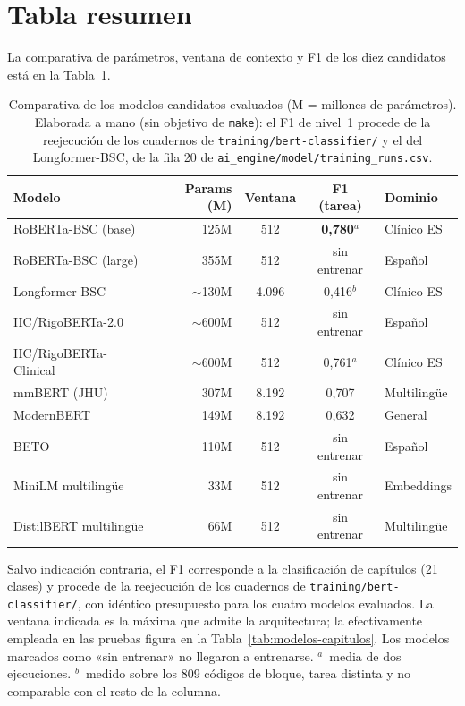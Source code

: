 \Needspace{0.65\textheight}
\section{Tabla resumen}

La comparativa de parámetros, ventana de contexto y F1 de los diez candidatos está en la Tabla~\ref{tab:modelos}.

\begin{table}[h]
\centering
\caption{Comparativa de los modelos candidatos evaluados (M = millones de parámetros). Elaborada a mano (sin objetivo de \texttt{make}): el F1 de nivel~1 procede de la reejecución de los cuadernos de \texttt{training/\allowbreak bert-classifier/} y el del Longformer-BSC, de la fila 20 de \texttt{ai\_engine/\allowbreak model/\allowbreak training\_runs.csv}.}
\label{tab:modelos}
\begin{tabular}{lrccl}
\hline
\textbf{Modelo} & \textbf{Params (M)} & \textbf{Ventana} & \textbf{F1 (tarea)} & \textbf{Dominio} \\
\hline
RoBERTa-BSC (base) & 125M & 512 & \textbf{0{,}780}$^{a}$ & Clínico ES \\
RoBERTa-BSC (large) & 355M & 512 &  sin entrenar & Español \\
Longformer-BSC & $\sim$130M & 4.096 & 0{,}416$^{b}$ & Clínico ES \\
IIC/RigoBERTa-2.0 & $\sim$600M & 512 &  sin entrenar & Español \\
IIC/RigoBERTa-Clinical & $\sim$600M & 512 & 0{,}761$^{a}$ & Clínico ES \\
mmBERT (JHU) & 307M & 8.192 & 0{,}707 & Multilingüe \\
ModernBERT & 149M & 8.192 & 0{,}632 & General \\
BETO & 110M & 512 &  sin entrenar & Español \\
MiniLM multilingüe & 33M & 512 &  sin entrenar & Embeddings \\
DistilBERT multilingüe & 66M & 512 &  sin entrenar & Multilingüe \\
\hline
\end{tabular}

\smallskip\par\footnotesize Salvo indicación contraria, el F1 corresponde a la clasificación de capítulos (21 clases) y procede de la reejecución de los cuadernos de \texttt{training/bert-classifier/}, con idéntico presupuesto para los cuatro modelos evaluados. La ventana indicada es la máxima que admite la arquitectura; la efectivamente empleada en las pruebas figura en la Tabla~\ref{tab:modelos-capitulos}. Los modelos marcados como «sin entrenar» no llegaron a entrenarse. $^{a}$~media de dos ejecuciones. $^{b}$~medido sobre los 809 códigos de bloque, tarea distinta y no comparable con el resto de la columna.
\end{table}

